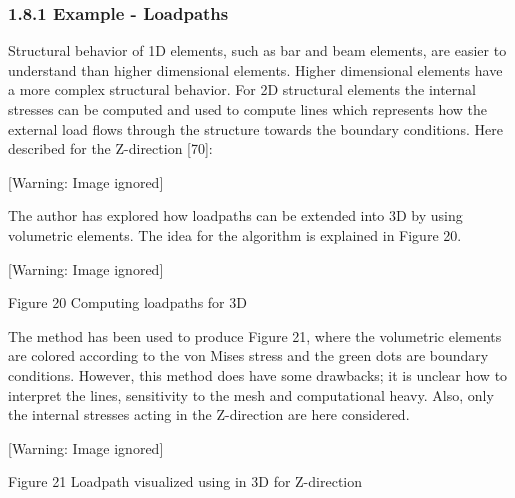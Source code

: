 \subsubsection[1.8.1 Example {}- Loadpaths]{1.8.1 Example - Loadpaths}
Structural behavior of 1D elements, such as bar and beam elements, are easier to understand than higher dimensional elements. Higher dimensional elements have a more complex structural behavior. For 2D structural elements the internal stresses can be computed and used to compute lines which represents how the external load flows through the structure towards the boundary conditions. Here described for the Z-direction [70]:



  [Warning: Image ignored] %
 





The author has explored how loadpaths can be extended into 3D by using volumetric elements. The idea for the algorithm is explained in Figure 20.



  [Warning: Image ignored] %
 

Figure 20 Computing loadpaths for 3D

The method has been used to produce Figure 21, where the volumetric elements are colored according to the von Mises stress and the green dots are boundary conditions. However, this method does have some drawbacks; it is unclear how to interpret the lines, sensitivity to the mesh and computational heavy. Also, only the internal stresses acting in the Z-direction are here considered.

  [Warning: Image ignored] %
 

Figure 21 Loadpath visualized using in 3D for Z-direction

